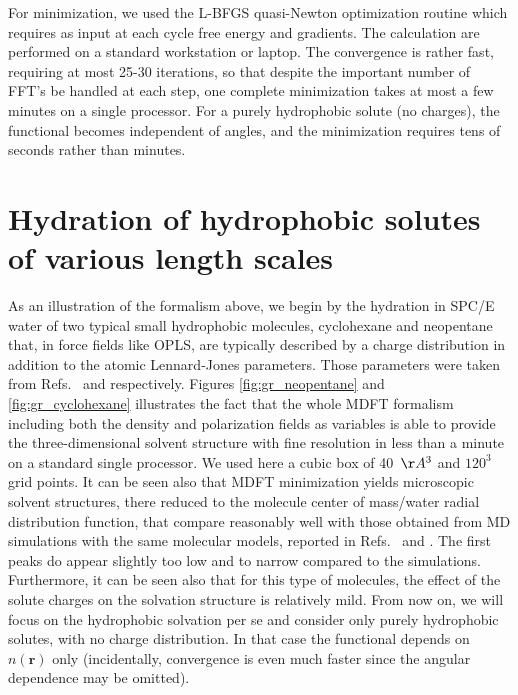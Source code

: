 \documentclass[aip,jcp,preprint]{revtex4-1}
\newcommand{\rr}{\mathbf{r}}
\begin{document}
For minimization, we used the L-BFGS quasi-Newton optimization routine\cite{BFGS} which requires as input at each cycle free energy and gradients.  The calculation are performed on  a standard  workstation or laptop. The convergence is rather fast, requiring at most 25-30 iterations, so that despite the important number of FFT's be handled at each step, one complete minimization takes at most a few minutes on a single processor.  For a purely hydrophobic solute (no charges), the functional becomes independent of angles,  and the minimization requires tens of seconds rather than minutes. 




\section{Hydration of hydrophobic solutes of various length scales}

As an illustration of the formalism above, we begin by the hydration in SPC/E water of two typical small hydrophobic molecules, cyclohexane and neopentane that, in force fields like OPLS, are typically described by a charge distribution in addition to the atomic Lennard-Jones parameters. Those parameters were taken from Refs.~ and  respectively. Figures \ref{fig:gr_neopentane} and \ref{fig:gr_cyclohexane} illustrates the fact that the whole MDFT formalism including both the density and polarization fields as variables is able to provide the three-dimensional solvent structure with fine resolution in less than a minute on a standard single processor. We used here a cubic box of 40~$\AA^3$ and $120^3$ grid points. It can be seen also that MDFT minimization yields  microscopic solvent structures, there reduced to the molecule center of mass/water radial distribution function, that compare reasonably well with those obtained from MD simulations with the same molecular models, reported in  Refs.~ and . The first peaks do appear slightly too low and to narrow compared to the simulations. Furthermore, it can be seen also that for this type of molecules, the effect of the solute charges on the solvation structure is relatively mild. From now on, we will focus on the hydrophobic solvation per se and consider only purely hydrophobic solutes, with no charge distribution. In that case the functional depends on $n(\rr)$ only (incidentally, convergence is even much faster since the angular dependence may be omitted).   
\end{document}
